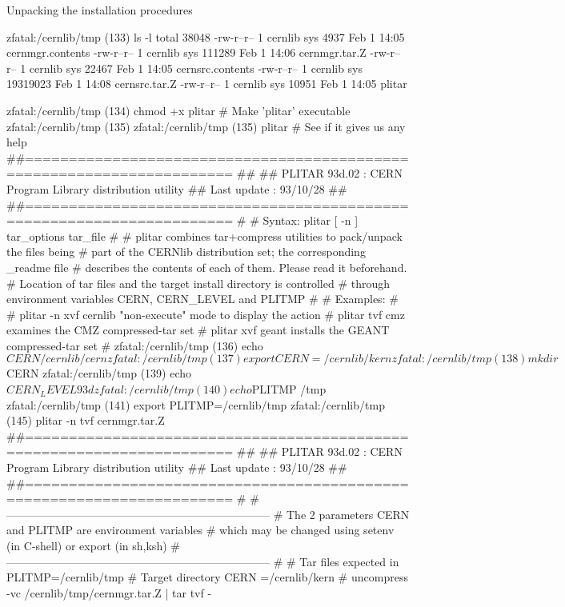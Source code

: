\begin{XMPt}{Unpacking the installation procedures}

zfatal:/cernlib/tmp (133) ls -l
total 38048
-rw-r--r--   1 cernlib  sys         4937 Feb  1 14:05 cernmgr.contents
-rw-r--r--   1 cernlib  sys       111289 Feb  1 14:06 cernmgr.tar.Z
-rw-r--r--   1 cernlib  sys        22467 Feb  1 14:05 cernsrc.contents
-rw-r--r--   1 cernlib  sys      19319023 Feb  1 14:08 cernsrc.tar.Z
-rw-r--r--   1 cernlib  sys        10951 Feb  1 14:05 plitar

zfatal:/cernlib/tmp (134) chmod +x plitar  # Make 'plitar' executable
zfatal:/cernlib/tmp (135) 
zfatal:/cernlib/tmp (135) plitar           # See if it gives us any help
##======================================================================
##
## PLITAR   93d.02  : CERN Program Library distribution utility
## Last update      : 93/10/28
##
##======================================================================
#
#  Syntax: plitar [ -n ] tar_options tar_file
#
#  plitar combines tar+compress utilities to pack/unpack the files being
#  part of the CERNlib distribution set; the corresponding _readme file
#  describes the contents of each of them. Please read it beforehand.
#  Location of tar files and the target install directory is controlled
#  through environment variables CERN, CERN_LEVEL and PLITMP
#
#  Examples:
#
#  plitar -n xvf cernlib   "non-execute" mode to display the action
#  plitar tvf cmz          examines the CMZ compressed-tar set
#  plitar xvf geant        installs the GEANT compressed-tar set
#
zfatal:/cernlib/tmp (136) echo $CERN
/cernlib/cern
zfatal:/cernlib/tmp (137) export CERN=/cernlib/kern
zfatal:/cernlib/tmp (138) mkdir $CERN
zfatal:/cernlib/tmp (139) echo $CERN_LEVEL
93d
zfatal:/cernlib/tmp (140) echo $PLITMP
/tmp
zfatal:/cernlib/tmp (141) export PLITMP=/cernlib/tmp
zfatal:/cernlib/tmp (145) plitar -n tvf cernmgr.tar.Z
##======================================================================
##
## PLITAR   93d.02  : CERN Program Library distribution utility
## Last update      : 93/10/28
##
##======================================================================
#
# -----------------------------------------------------------------------
# The 2 parameters CERN and PLITMP are environment variables
# which may be changed using setenv (in C-shell) or export (in sh,ksh)
# -----------------------------------------------------------------------
#
# Tar files expected in      PLITMP=/cernlib/tmp
# Target directory           CERN  =/cernlib/kern
#
         uncompress -vc /cernlib/tmp/cernmgr.tar.Z |  tar tvf  -



\end{XMPt}
